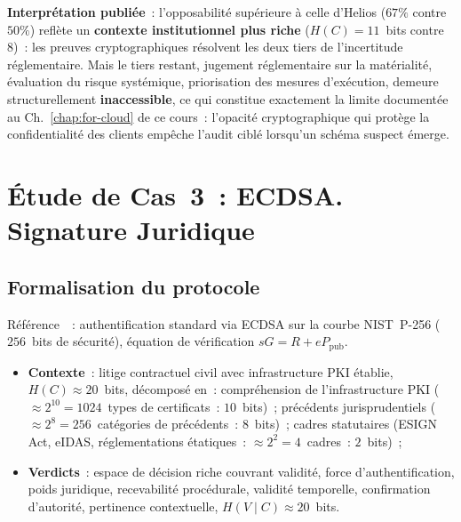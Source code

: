 \textbf{Interprétation publiée}~: l'opposabilité supérieure à celle
d'Helios ($67\%$ contre~$50\%$) reflète un \textbf{contexte
institutionnel plus riche} ($H(C)=11$~bits contre~$8$)~: les
preuves cryptographiques résolvent les deux tiers de l'incertitude
réglementaire. Mais le tiers restant, jugement réglementaire sur
la matérialité, évaluation du risque systémique, priorisation des
mesures d'exécution, demeure structurellement
\textbf{inaccessible}, ce qui constitue exactement la limite
documentée au Ch.~\ref{chap:for-cloud} de ce cours~: l'opacité
cryptographique qui protège la confidentialité des clients
empêche l'audit ciblé lorsqu'un schéma suspect émerge.

\section{Étude de Cas~3~: ECDSA. Signature Juridique}
\label{sec:cas-ecdsa}

\subsection{Formalisation du protocole}

Référence~\cite{johnson2001ecdsa}~: authentification standard via
ECDSA sur la courbe NIST~P-256 ($256$~bits de sécurité),
équation de vérification $sG = R + eP_{\mathrm{pub}}$.

\begin{itemize}
    \item \textbf{Contexte}~: litige contractuel civil avec
          infrastructure PKI établie, $H(C) \approx 20$~bits, décomposé
          en~:
          compréhension de l'infrastructure PKI
          ($\approx 2^{10}=1024$~types de certificats~: $10$~bits)~;
          précédents jurisprudentiels
          ($\approx 2^8=256$~catégories de précédents~: $8$~bits)~;
          cadres statutaires (ESIGN Act, eIDAS, réglementations
          étatiques~: $\approx 2^2=4$~cadres~: $2$~bits)~;
    \item \textbf{Verdicts}~: espace de décision riche couvrant
          validité, force d'authentification, poids juridique,
          recevabilité procédurale, validité temporelle, confirmation
          d'autorité, pertinence contextuelle, $H(V\mid C)
          \approx 20$~bits.
\end{itemize}

